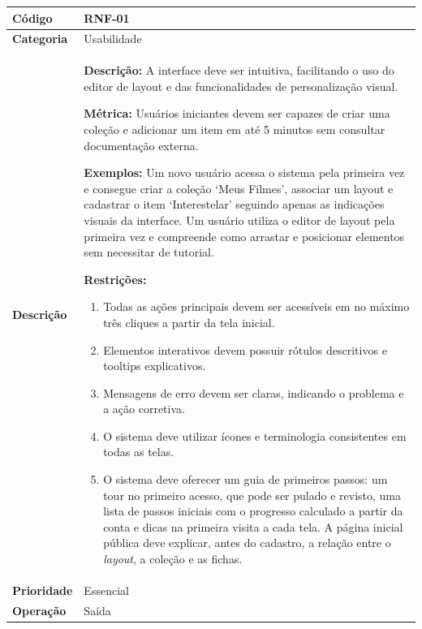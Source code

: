 \FloatBarrier
\begin{quadro}[h!]
\caption{RNF-01 -- Usabilidade}
\label{quad:rnf01}
\begin{tabular}{|p{3.2cm}|p{11.8cm}|}
\hline
\textbf{Código}     & RNF-01 \\ \hline
\textbf{Categoria}  & Usabilidade \\ \hline
\textbf{Descrição}  &
\textbf{Descrição:} A interface deve ser intuitiva, facilitando o uso do editor de layout e das funcionalidades de personalização visual.

\textbf{Métrica:} Usuários iniciantes devem ser capazes de criar uma coleção e adicionar um item em até 5 minutos sem consultar documentação externa.

\textbf{Exemplos:} Um novo usuário acessa o sistema pela primeira vez e consegue criar a coleção `Meus Filmes', associar um layout e cadastrar o item `Interestelar' seguindo apenas as indicações visuais da interface.
Um usuário utiliza o editor de layout pela primeira vez e compreende como arrastar e posicionar elementos sem necessitar de tutorial.

\textbf{Restrições:}
\begin{enumerate}[nosep,leftmargin=1.2em,topsep=2pt,partopsep=0pt,parsep=0pt,itemsep=1pt]
  \item Todas as ações principais devem ser acessíveis em no máximo três cliques a partir da tela inicial.
  \item Elementos interativos devem possuir rótulos descritivos e tooltips explicativos.
  \item Mensagens de erro devem ser claras, indicando o problema e a ação corretiva.
  \item O sistema deve utilizar ícones e terminologia consistentes em todas as telas.
  \item O sistema deve oferecer um guia de primeiros passos: um tour no primeiro acesso, que pode ser pulado e revisto, uma lista de passos iniciais com o progresso calculado a partir da conta e dicas na primeira visita a cada tela. A página inicial pública deve explicar, antes do cadastro, a relação entre o \textit{layout}, a coleção e as fichas.
\end{enumerate} \\ \hline
\textbf{Prioridade} & Essencial \\ \hline
\textbf{Operação}   & Saída \\ \hline
\end{tabular}
\end{quadro}

